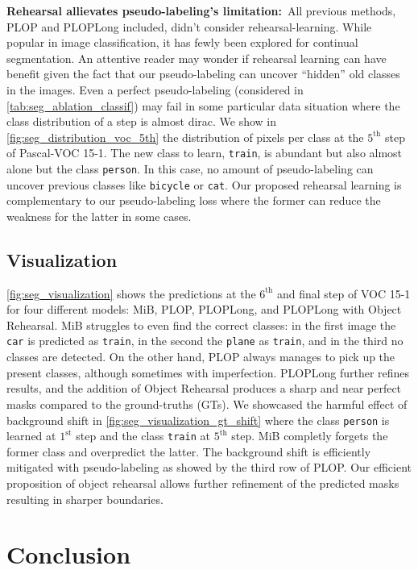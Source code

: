 \noindent\textbf{Rehearsal allievates pseudo-labeling's limitation:\,} All previous methods, PLOP
and PLOPLong included, didn't consider rehearsal-learning. While popular in image classification, it
has fewly been explored for continual segmentation. An attentive reader may wonder if rehearsal
learning can have benefit given the fact that our pseudo-labeling can uncover ``hidden'' old classes
in the images. Even a perfect pseudo-labeling (considered in \autoref{tab:seg_ablation_classif}) may
fail in some particular data situation where the class distribution of a step is almost dirac. We
show in \autoref{fig:seg_distribution_voc_5th} the distribution of pixels per class at the
$5^{\text{th}}$ step of Pascal-VOC 15-1. The new class to learn, \texttt{train}, is abundant but
also almost alone but the class \texttt{person}. In this case, no amount of pseudo-labeling can
uncover previous classes like \texttt{bicycle} or \texttt{cat}. Our proposed rehearsal learning is
complementary to our pseudo-labeling loss where the former can reduce the weakness for the latter in
some cases.

\subsection{Visualization}

\autoref{fig:seg_visualization} shows the predictions at the $6^\text{th}$ and final step of VOC
15-1 for four different models: MiB, PLOP, PLOPLong, and PLOPLong with Object Rehearsal. MiB
struggles to even find the correct classes: in the first image the \texttt{car} is predicted as
\texttt{train}, in the second the \texttt{plane} as \texttt{train}, and in the third no classes are
detected. On the other hand, PLOP always manages to pick up the present classes, although sometimes
with imperfection. PLOPLong further refines results, and the addition of Object Rehearsal produces a
sharp and near perfect masks compared to the ground-truths (GTs). We showcased the harmful effect of
background shift in \autoref{fig:seg_visualization_gt_shift} where the class \texttt{person} is
learned at $1^\text{st}$ step and the class \texttt{train} at $5^\text{th}$ step. MiB completly
forgets the former class and overpredict the latter. The background shift is efficiently mitigated
with pseudo-labeling as showed by the third row of PLOP. Our efficient proposition of object
rehearsal allows further refinement of the predicted masks resulting in sharper boundaries.

\section{Conclusion}
\label{sec:seg_conclusion}

